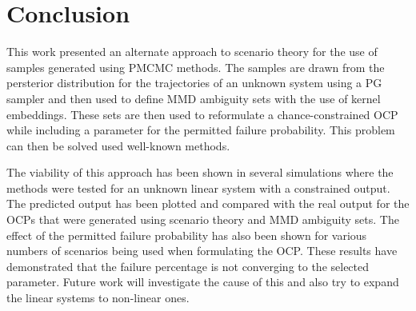 \chapter{Conclusion} \label{Conclusion}

This work presented an alternate approach to scenario theory for the use of samples generated using PMCMC methods. The samples are drawn from the persterior distribution for the trajectories of an unknown system using a PG sampler and then used to define MMD ambiguity sets with the use of kernel embeddings. These sets are then used to reformulate a chance-constrained OCP while including a parameter for the permitted failure probability. This problem can then be solved used well-known methods.

The viability of this approach has been shown in several simulations where the methods were tested for an unknown linear system with a constrained output. The predicted output has been plotted and compared with the real output for the OCPs that were generated using scenario theory and MMD ambiguity sets. The effect of the permitted failure probability has also been shown for various numbers of scenarios being used when formulating the OCP. These results have demonstrated that the failure percentage is not converging to the selected parameter. Future work will investigate the cause of this and also try to expand the linear systems to non-linear ones.





